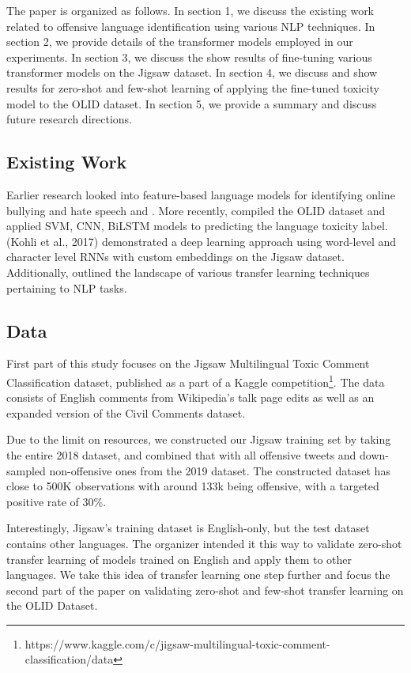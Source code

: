 \documentclass[11pt,a4paper]{article}
\begin{document}
The paper is organized as follows. In section 1, we discuss the existing work related to offensive language identification using various NLP techniques. In section 2, we provide details of the transformer models employed in our experiments. In section 3, we discuss the show results of fine-tuning various transformer models on the Jigsaw dataset. In section 4, we discuss and show results for zero-shot and few-shot learning of applying the fine-tuned toxicity model to the OLID dataset. In section 5, we provide a summary and discuss future research directions.


\subsection{Existing Work}

Earlier research looked into feature-based language models for identifying online bullying and hate speech \citep{6406271} and \citep{huang}. More recently, \citep{zampieri-etal-2019-predicting} compiled the OLID dataset and applied SVM, CNN, BiLSTM models to predicting the language toxicity label. (Kohli et al., 2017) demonstrated a deep learning approach using word-level and character level RNNs with custom embeddings on the Jigsaw dataset. Additionally, \citep{ruder-etal-2019-transfer} outlined the landscape of various transfer learning techniques pertaining to NLP tasks.  

\subsection{Data}
First part of this study focuses on the Jigsaw Multilingual Toxic Comment Classification dataset, published as a part of a Kaggle competition\footnote{https://www.kaggle.com/c/jigsaw-multilingual-toxic-comment-classification/data}. The data consists of English comments from Wikipedia’s talk page edits as well as an expanded version of the Civil Comments dataset. 

Due to the limit on resources, we constructed our Jigsaw training set by taking the entire 2018 dataset, and combined that with all offensive tweets and down-sampled non-offensive ones from the 2019 dataset. The constructed dataset has close to 500K observations with around 133k being offensive, with a targeted positive rate of 30\%.

Interestingly, Jigsaw’s training dataset is English-only, but the test dataset contains other languages. The organizer intended it this way to validate zero-shot transfer learning of models trained on English and apply them to other languages. We take this idea of transfer learning one step further and focus the second part of the paper on validating zero-shot and few-shot transfer learning on the OLID Dataset\citep{zampieri-etal-2019-predicting}.
\end{document}
